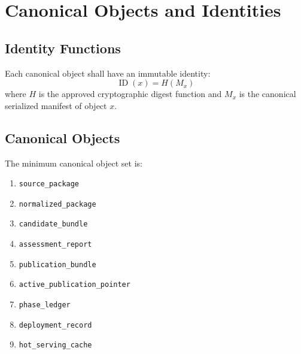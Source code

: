 \chapter{Canonical Objects and Identities}
\section{Identity Functions}

Each canonical object shall have an immutable identity:
\[
\operatorname{ID}(x) = H(M_x)
\]
where \(H\) is the approved cryptographic digest function and \(M_x\) is the canonical serialized manifest of object \(x\).

\section{Canonical Objects}
The minimum canonical object set is:
\begin{enumerate}[leftmargin=1.2cm]
    \item \texttt{source\_package}
    \item \texttt{normalized\_package}
    \item \texttt{candidate\_bundle}
    \item \texttt{assessment\_report}
    \item \texttt{publication\_bundle}
    \item \texttt{active\_publication\_pointer}
    \item \texttt{phase\_ledger}
    \item \texttt{deployment\_record}
    \item \texttt{hot\_serving\_cache}
\end{enumerate}
